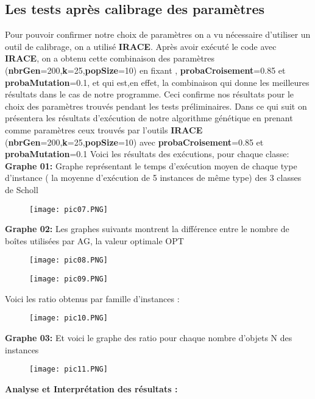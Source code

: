 \documentclass{report}
\begin{document}
\subsection{Les tests après calibrage des paramètres}
Pour pouvoir confirmer notre choix de paramètres on a vu nécessaire d’utiliser un outil de calibrage, on a utilisé \textbf{IRACE}. 
\newline
Après avoir exécuté le code avec \textbf{IRACE}, on a obtenu cette combinaison des paramètres (\textbf{nbrGen}=200,\textbf{k}=25,\textbf{popSize}=10) en fixant , \textbf{probaCroisement}=0.85 et \textbf{probaMutation}=0.1, et qui est,en effet, la combinaison qui donne les meilleures résultats dans le cas de notre programme. Ceci confirme nos résultats pour le choix des paramètres trouvés pendant les tests préliminaires.
\newline
\newline
Dans ce qui suit on présentera les résultats d’exécution de notre algorithme génétique en prenant comme paramètres ceux trouvés par l’outils \textbf{IRACE} (\textbf{nbrGen}=200,\textbf{k}=25,\textbf{popSize}=10) avec \textbf{probaCroisement}=0.85 et \textbf{probaMutation}=0.1
\newline
Voici les résultats des exécutions, pour chaque classe:
\newline
\textbf{Graphe 01:}
Graphe représentant le temps d'exécution moyen de chaque type d’instance ( la moyenne d'exécution de 5 instances de même type) des 3 classes de Scholl
\begin{figure}[H]
  \texttt{[image: pic07.PNG]}
\end{figure}
\textbf{Graphe 02:}
Les graphes suivants montrent la différence entre le nombre de boîtes utilisées par AG, la valeur optimale OPT
\begin{figure}[H]
  \texttt{[image: pic08.PNG]}
\end{figure}
\begin{figure}[H]
  \texttt{[image: pic09.PNG]}
\end{figure}
Voici les ratio obtenus par famille d’instances :
\begin{figure}[H]
  \texttt{[image: pic10.PNG]}
\end{figure}
\textbf{Graphe 03:}
Et voici le graphe des ratio pour chaque nombre d'objets N des instances 
\begin{figure}[H]
  \texttt{[image: pic11.PNG]}
\end{figure}
\textbf{Analyse et Interprétation des résultats : }
\end{document}
